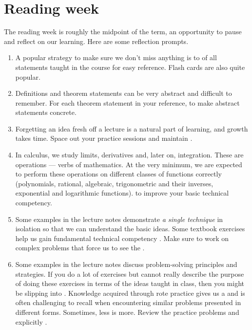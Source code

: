 \documentclass[../main.tex]{subfiles}
\begin{document}
 \section{Reading week}
  The reading week is roughly the midpoint of the term, an opportunity to pause and reflect on our learning. Here are some reflection prompts.

  \begin{enumerate}
    \item {} A popular strategy to make sure we don't miss anything is to  of all statements taught in the course for easy reference. Flash cards are also quite popular.

    \item {} Definitions and theorem statements can be very abstract and difficult to remember. For each theorem statement in your reference,  to make abstract statements concrete.

    \item {} Forgetting an idea fresh off a lecture is a natural part of learning, and growth takes time. Space out your practice sessions and maintain .

    \item {} In calculus, we study limits, derivatives and, later on, integration. These are operations --- verbs of mathematics. At the very minimum, we are expected to perform these operations on different classes of functions correctly (polynomials, rational, algebraic, trigonometric and their inverses, exponential and logarithmic functions).  to improve your basic technical competency.

    \item {} Some examples in the lecture notes demonstrate \emph{a single technique} in isolation so that we can understand the basic ideas. Some textbook exercises help us gain fundamental technical competency . Make sure to work on complex problems that force us to see the .

    \item {} Some examples in the lecture notes discuss problem-solving principles and strategies. If you do a lot of exercises but cannot really describe the purpose of doing these exercises in terms of the ideas taught in class, then you might be slipping into . Knowledge acquired through rote practice gives us a  and is often challenging to recall when encountering similar problems presented in different forms. Sometimes, less is more. Review the practice problems and explicitly . 


\end{enumerate}
\end{document}
